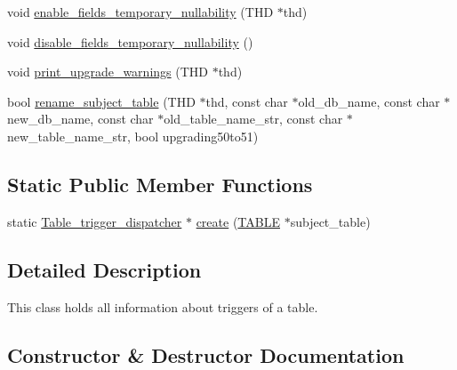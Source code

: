 \begin{DoxyCompactItemize}
void \mbox{\hyperlink{classTable__trigger__dispatcher_a6b3a1c6bfb3c05254e232abf2db166f0}{enable\+\_\+fields\+\_\+temporary\+\_\+nullability}} (T\+HD $\ast$thd)
\item 
void \mbox{\hyperlink{classTable__trigger__dispatcher_a1b452d2138ee5d21b0b53e594718def0}{disable\+\_\+fields\+\_\+temporary\+\_\+nullability}} ()
\item 
void \mbox{\hyperlink{classTable__trigger__dispatcher_a30896a7deaa5b4f2c8d638367ca5fac3}{print\+\_\+upgrade\+\_\+warnings}} (T\+HD $\ast$thd)
\item 
bool \mbox{\hyperlink{classTable__trigger__dispatcher_ac020fa3def58921a4380348a6db46491}{rename\+\_\+subject\+\_\+table}} (T\+HD $\ast$thd, const char $\ast$old\+\_\+db\+\_\+name, const char $\ast$new\+\_\+db\+\_\+name, const char $\ast$old\+\_\+table\+\_\+name\+\_\+str, const char $\ast$new\+\_\+table\+\_\+name\+\_\+str, bool upgrading50to51)
\end{DoxyCompactItemize}
\subsection*{Static Public Member Functions}
\begin{DoxyCompactItemize}
\item 
static \mbox{\hyperlink{classTable__trigger__dispatcher}{Table\+\_\+trigger\+\_\+dispatcher}} $\ast$ \mbox{\hyperlink{classTable__trigger__dispatcher_a892a3e44cf1ddfa4e6245cc0c4bb0c6d}{create}} (\mbox{\hyperlink{structTABLE}{T\+A\+B\+LE}} $\ast$subject\+\_\+table)
\end{DoxyCompactItemize}


\subsection{Detailed Description}
This class holds all information about triggers of a table. 

\subsection{Constructor \& Destructor Documentation}
\mbox{\label{classTable__trigger__dispatcher_a2b614568870b03e1314d731bcb5b8272}} 
